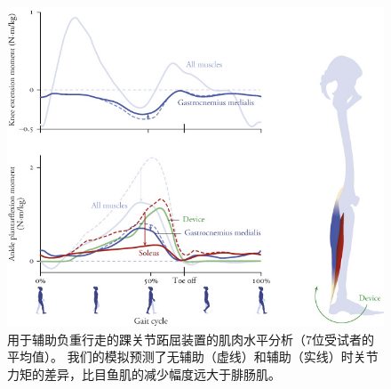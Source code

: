 \begin{figure}[!htb]
	\centering
	\includegraphics[width=1.0\linewidth]{chap11/11_20}
	\caption{用于辅助负重行走的踝关节跖屈装置的肌肉水平分析（7位受试者的平均值）。
		我们的模拟预测了无辅助（虚线）和辅助（实线）时关节力矩的差异，比目鱼肌的减少幅度远大于腓肠肌\cite{dembia2017simulating}。 \label{fig:11_20}}
\end{figure}






